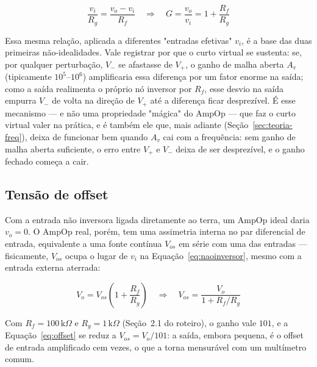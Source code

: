 \documentclass[11pt,a4paper]{article}
\begin{document}
\begin{equation}
\frac{v_i}{R_g} = \frac{v_o - v_i}{R_f} \quad\Rightarrow\quad
G = \frac{v_o}{v_i} = 1 + \frac{R_f}{R_g}
\label{eq:naoinversor}
\end{equation}

Essa mesma relação, aplicada a diferentes "entradas efetivas" \(v_i\), é a base das duas
primeiras não-idealidades. Vale registrar por que o curto virtual se sustenta: se, por qualquer
perturbação, \(V_-\) se afastasse de \(V_+\), o ganho de malha aberta \(A_v\) (tipicamente
\(10^5\)–\(10^6\)) amplificaria essa diferença por um fator enorme na saída; como a saída
realimenta o próprio nó inversor por \(R_f\), esse desvio na saída empurra \(V_-\) de volta na
direção de \(V_+\) até a diferença ficar desprezível. É esse mecanismo — e não uma propriedade
"mágica" do AmpOp — que faz o curto virtual valer na prática, e é também ele que, mais adiante
(Seção~\ref{sec:teoria-freq}), deixa de funcionar bem quando \(A_v\) cai com a frequência: sem
ganho de malha aberta suficiente, o erro entre \(V_+\) e \(V_-\) deixa de ser desprezível, e o
ganho fechado começa a cair.

\subsection{Tensão de offset}

Com a entrada não inversora ligada diretamente ao terra, um AmpOp ideal daria \(v_o=0\). O AmpOp
real, porém, tem uma assimetria interna no par diferencial de entrada, equivalente a uma fonte
contínua \(V_{os}\) em série com uma das entradas — fisicamente, \(V_{os}\) ocupa o lugar de
\(v_i\) na Equação~\eqref{eq:naoinversor}, mesmo com a entrada externa aterrada:

\begin{equation}
V_o = V_{os}\left(1+\frac{R_f}{R_g}\right) \quad\Rightarrow\quad
V_{os} = \frac{V_o}{1+R_f/R_g}
\label{eq:offset}
\end{equation}

Com \(R_f=100\,\text{k}\Omega\) e \(R_g=1\,\text{k}\Omega\) (Seção~2.1 do roteiro), o ganho vale
\(101\), e a Equação~\eqref{eq:offset} se reduz a \(V_{os}=V_o/101\): a saída, embora pequena, é
o offset de entrada amplificado cem vezes, o que a torna mensurável com um multímetro comum.
\end{document}
